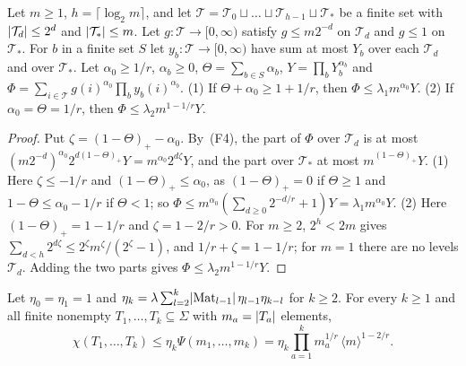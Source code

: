 \begin{lemma}\label{ord:lem:level-sum}
Let $m\ge1$, $h=\lceil\log_2m\rceil$, and let $\mathcal T=\mathcal T_0\sqcup\dots\sqcup\mathcal T_{h-1}\sqcup\mathcal T_\ast$
be a finite set with $\lvert \mathcal T_d\rvert\le2^d$ and $\lvert \mathcal T_\ast\rvert\le m$. Let $g\colon\mathcal T\to[0,\infty)$
satisfy $g\le m2^{-d}$ on $\mathcal T_d$ and $g\le1$ on $\mathcal T_\ast$. For $b$ in a finite set $S$ let
$y_b\colon\mathcal T\to[0,\infty)$ have sum at most $Y_b$ over each $\mathcal T_d$ and over $\mathcal T_\ast$. Let
$\alpha_0\ge1/r$, $\alpha_b\ge0$, $\Theta=\sum_{b\in S}\alpha_b$, $Y=\prod_bY_b^{\alpha_b}$ and
$\Phi=\sum_{i\in\mathcal T}g(i)^{\alpha_0}\prod_by_b(i)^{\alpha_b}$.
\textup{(1)} If $\Theta+\alpha_0\ge1+1/r$, then $\Phi\le\lambda_1m^{\alpha_0}Y$.
\textup{(2)} If $\alpha_0=\Theta=1/r$, then $\Phi\le\lambda_2m^{1-1/r}Y$.
\end{lemma}

\begin{proof}
Put $\zeta=(1-\Theta)_+-\alpha_0$. By~(F4), the part of $\Phi$ over $\mathcal T_d$ is at most
$(m2^{-d})^{\alpha_0}2^{d(1-\Theta)_+}Y=m^{\alpha_0}2^{d\zeta}Y$, and the part over $\mathcal T_\ast$ at most
$m^{(1-\Theta)_+}Y$. (1) Here $\zeta\le-1/r$ and $(1-\Theta)_+\le\alpha_0$, as $(1-\Theta)_+=0$ if $\Theta\ge1$ and
$1-\Theta\le\alpha_0-1/r$ if $\Theta<1$; so $\Phi\le m^{\alpha_0}(\sum_{d\ge0}2^{-d/r}+1)Y=\lambda_1m^{\alpha_0}Y$.
(2) Here $(1-\Theta)_+=1-1/r$ and $\zeta=1-2/r>0$. For $m\ge2$, $2^h<2m$ gives
$\sum_{d<h}2^{d\zeta}\le2^\zeta m^\zeta/(2^\zeta-1)$, and $1/r+\zeta=1-1/r$; for $m=1$ there are no levels
$\mathcal T_d$. Adding the two parts gives $\Phi\le\lambda_2m^{1-1/r}Y$.
\end{proof}

\begin{theorem}\label{ord:thm:weighted-box}
Let $\eta_0=\eta_1=1$ and $\eta_k=\lambda\sum_{l=2}^k\lvert \operatorname{Mat}_{l-1}\rvert\,\eta_{l-1}\eta_{k-l}$ for $k\ge2$.
For every $k\ge1$ and all finite nonempty $T_1,\dots,T_k\subseteq\Sigma$ with $m_a=\lvert T_a\rvert$ elements,
\[
 \chi(T_1,\dots,T_k)\le\eta_k\Psi(m_1,\dots,m_k)=\eta_k\prod_{a=1}^km_a^{1/r}\,\langle m\rangle^{1-2/r}.
\]
\end{theorem}

